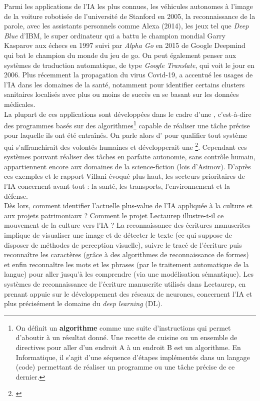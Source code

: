 Parmi les applications de l'IA les plus connues, les véhicules autonomes à l'image de la voiture robotisée de l'université de Stanford en 2005, la reconnaissance de la parole, avec les assistants personnels comme Alexa (2014), les jeux tel que \textit{Deep Blue} d'IBM, le super ordinateur qui a battu le champion mondial Garry Kasparov aux échecs en 1997 suivi par \textit{Alpha Go} en 2015 de Google Deepmind qui bat le champion du monde du jeu de go. On peut également penser aux systèmes de traduction automatique, de type \textit{Google Translate}, qui voit le jour en 2006. Plus récemment la propagation du virus Covid-19, a accentué les usages de l'IA dans les domaines de la santé, notamment pour identifier certains clusters sanitaires localisés avec plus ou moins de succès en se basant sur les données médicales. \\

La plupart de ces applications sont développées dans le cadre d'une , c'est-à-dire des programmes basés sur des algorithmes\footnote{On définit un \textbf{algorithme} comme une suite d'instructions qui permet d'aboutir à un résultat donné. Une recette de cuisine ou un ensemble de directives pour aller d'un endroit A à un endroit B est un algorithme. En Informatique, il s'agit d'une séquence d'étapes implémentés dans un langage (code) permettant de réaliser un programme ou une tâche précise de ce dernier.} capable de réaliser une tâche précise pour laquelle ils ont été entraînés. On parle alors d' pour qualifier tout système qui s'affranchirait des volontés humaines et développerait une \footnote{\cite{ganascia_mythe_nodate}}. Cependant ces systèmes pouvant réaliser des tâches en parfaite autonomie, sans contrôle humain, appartiennent encore aux domaines de la science-fiction (lois d'Asimov). D'après ces exemples et le rapport Villani évoqué plus haut, les secteurs prioritaires de l'IA concernent avant tout : la santé, les transports, l'environnement et la défense. \\

Dès lors, comment identifier l'actuelle plus-value de l'IA appliquée à la culture et aux projets patrimoniaux ? Comment le projet Lectaurep illustre-t-il ce mouvement de la culture vers l'IA ? 
La reconnaissance des écritures manuscrites implique de visualiser une image et de détecter le texte (ce qui suppose de disposer de méthodes de perception visuelle), suivre le tracé de l'écriture puis reconnaître les caractères (grâce à des algorithmes de reconnaissance de formes) et enfin reconnaître les mots et les phrases (par le traitement automatique de la langue) pour aller jusqu'à les comprendre (via une modélisation sémantique). Les systèmes de reconnaissance de l'écriture manuscrite utilisés dans Lectaurep, en prenant appuie sur le développement des réseaux de neurones, concernent l'IA et plus précisément le domaine du \textit{deep learning} (DL).\\

